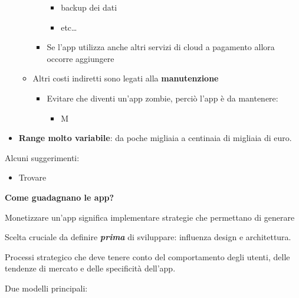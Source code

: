 \begin{itemize}
\begin{itemize}
\begin{itemize}
\begin{itemize}
                \item backup dei dati
                \item etc\dots
            \end{itemize}
            \item Se l'app utilizza anche altri servizi di cloud a pagamento allora occorre aggiungere
        \end{itemize}
        \item Altri costi indiretti sono legati alla \textbf{manutenzione}
        \begin{itemize}
            \item Evitare che diventi un'app zombie, perciò l'app è da mantenere:
            \begin{itemize}
                \item M
            \end{itemize}
        \end{itemize}
    \end{itemize}
    \item \textbf{Range molto variabile}: da poche migliaia a centinaia di migliaia di euro.
\end{itemize}
\par Alcuni suggerimenti:
\begin{itemize}
    \item Trovare 
\end{itemize}

\par \textbf{Come guadagnano le app?}
\par Monetizzare un'app significa implementare strategie che permettano di generare


\par Scelta cruciale da definire \textbf{\textit{prima}} di sviluppare: influenza design e architettura.
\par Processi strategico che deve tenere conto del comportamento degli utenti, delle tendenze di mercato e delle specificità dell'app.
\par Due modelli principali:


